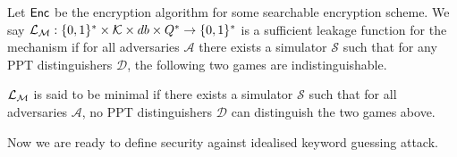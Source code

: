 \begin{definition}
Let $\mathsf{Enc}$ be the encryption algorithm for some searchable encryption scheme. We say $\mathcal{L}_\mathcal{M}: \{0,1\}^{*} \times \mathcal{K} \times db \times Q^{*} \rightarrow \{0,1\}^{*}$ is a sufficient leakage function for the mechanism if for all adversaries $\mathcal{A}$ there exists a simulator $\mathcal{S}$ such that for any PPT distinguishers $\mathcal{D}$, the following two games are indistinguishable.
	
\begin{pchstack}[center]

\pchspace
{}
\end{pchstack}

$\mathcal{L}_\mathcal{M}$ is said to be minimal if there exists a simulator $\mathcal{S}$ such that for all adversaries $\mathcal{A}$, no PPT distinguishers $\mathcal{D}$ can distinguish the two games above.
\end{definition}


Now we are ready to define security against idealised keyword guessing attack.


